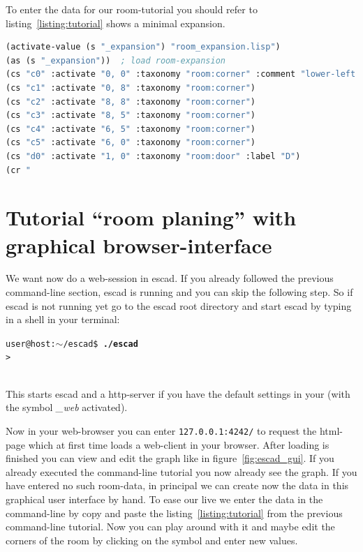 \documentclass[a4paper, 12pt, openany]{scrbook}
\makeatletter
\newcommand{\shellcmdline}[2]{\\
  \setlength{\fboxsep}{2pt}\colorbox{black!20}{\parbox{\textwidth}{\texttt{user@host:$\sim$/escad\$ \textbf{#1}\\#2}}}\\}
\newcommand{\escadcmdline}[2]{\\\setlength{\fboxsep}{2pt}\colorbox{black!20}{\parbox{\textwidth}{\texttt{ESCAD> \textbf{#1}\\#2}}}\\}
\makeatother
\begin{document}
To enter the data for our room-tutorial you should refer to listing~\ref{listing:tutorial} shows a minimal expansion.
\begin{lstlisting}[caption={Code for the room-tutorial.}, language=Lisp, morekeywords={do-external-symbols, find-package, in-package, slot-value, use, with-slots}, label=listing:tutorial]
(activate-value (s "_expansion") "room_expansion.lisp")
(as (s "_expansion"))  ; load room-expansion
(cs "c0" :activate "0, 0" :taxonomy "room:corner" :comment "lower-left point of the room (base)")
(cs "c1" :activate "0, 8" :taxonomy "room:corner")
(cs "c2" :activate "8, 8" :taxonomy "room:corner")
(cs "c3" :activate "8, 5" :taxonomy "room:corner")
(cs "c4" :activate "6, 5" :taxonomy "room:corner")
(cs "c5" :activate "6, 0" :taxonomy "room:corner")
(cs "d0" :activate "1, 0" :taxonomy "room:door" :label "D")
(cr "
\end{lstlisting}
\section{Tutorial ``room planing'' with graphical browser-interface}
We want now do a web-session in escad. If you already followed the previous command-line section, escad is running and you can skip the following step. So if escad is not running yet go to the escad root directory and start escad by typing in a shell in your terminal:
\shellcmdline{./escad}{>}
This starts escad and a http-server if you have the default settings in your  (with the symbol \emph{\_web} activated).

Now in your web-browser you can enter \texttt{127.0.0.1:4242/} to request the html-page which at first time loads a web-client in your browser. After loading is finished you can view and edit the graph like in figure~\ref{fig:escad_gui}. If you already executed the command-line tutorial you now already see the graph. If you have entered no such room-data, in principal we can create now the data in this graphical user interface by hand. To ease our live we enter the data in the command-line by copy and paste the listing~\ref{listing:tutorial} from the previous command-line tutorial. Now you can play around with it and maybe edit the corners of the room by clicking on the symbol and enter new values.
\end{document}
